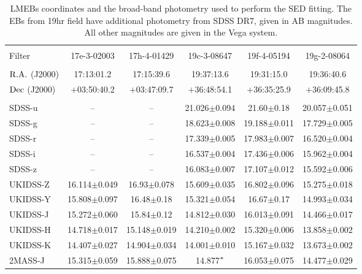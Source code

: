 \documentclass[fleqn,usenatbib]{mnras}
\begin{document}
\begin{table*}
\begin{center}
\caption{LMEBs coordinates and the broad-band photometry used to perform the SED fitting. The EBs from 19hr field have additional photometry from SDSS DR7, given in AB magnitudes. All other magnitudes are given in the Vega system.}

\label{tab_filters}
\begin{tabular}{lccccc}
\hline \hline \\ [-3ex]
Filter & 17e-3-02003 & 17h-4-01429 & 19c-3-08647 & 19f-4-05194 & 19g-2-08064 \\
\hline\\  [-2ex]

${\rm R.A.}$ {\scriptsize (J2000)} & 17:13:01.2 & 17:15:39.6 & 19:37:13.6 & 19:31:15.0 & 19:36:40.6 \\ 
${\rm Dec}$ {\scriptsize (J2000)} & $+$03:50:40.2 & $+$03:47:09.7 & $+$36:48:54.1 & $+$36:35:25.9 & $+$36:09:45.8 \\ 
\\  [-2ex]
SDSS-u   & -- & -- & 21.026$\pm$0.094 & 21.60$\pm$0.18 & 20.057$\pm$0.051 \\ 
SDSS-g   & -- & -- & 18.623$\pm$0.008 & 19.188$\pm$0.011 & 17.729$\pm$0.005 \\ 
SDSS-r   & -- & -- & 17.339$\pm$0.005 & 17.983$\pm$0.007 & 16.520$\pm$0.004 \\ 
SDSS-i   & -- & -- & 16.537$\pm$0.004 & 17.436$\pm$0.006 & 15.962$\pm$0.004 \\ 
SDSS-z   & -- & -- & 16.083$\pm$0.007 & 17.107$\pm$0.012 & 15.592$\pm$0.006 \\ 
UKIDSS-Z & 16.114$\pm$0.049 & 16.93$\pm$0.078 & 15.609$\pm$0.035 & 16.802$\pm$0.096 & 15.275$\pm$0.018 \\ 
UKIDSS-Y & 15.808$\pm$0.097 & 16.48$\pm$0.18 & 15.321$\pm$0.054 & 16.67$\pm$0.17 & 14.993$\pm$0.034 \\
UKIDSS-J & 15.272$\pm$0.060 & 15.84$\pm$0.12 & 14.812$\pm$0.030 & 16.013$\pm$0.091 & 14.466$\pm$0.017 \\
UKIDSS-H & 14.718$\pm$0.017 & 15.148$\pm$0.019 & 14.210$\pm$0.002 & 15.320$\pm$0.006 & 13.858$\pm$0.002 \\
UKIDSS-K & 14.407$\pm$0.027 & 14.904$\pm$0.034 & 14.001$\pm$0.010 & 15.167$\pm$0.032 & 13.673$\pm$0.002 \\
2MASS-J  & 15.315$\pm$0.059 & 15.888$\pm$0.075 & 14.877$^{\rm *}$ & 16.053$\pm$0.075 & 14.477$\pm$0.029 \\

\end{tabular}
\end{center}
\end{table*}
\end{document}
